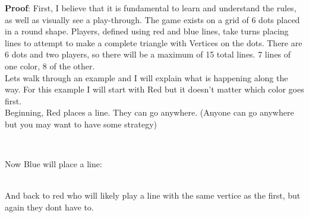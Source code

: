 \documentclass[10pt, AMS Euler]{article}
\begin{document}
\begin{enumerate}
\textbf{Proof}:
First, I believe that it is fundamental to learn and understand the rules, as well as visually see a play-through. The game exists on a grid of 6 dots placed in a round shape. Players, defined using red and blue lines, take turns placing lines to attempt to make a complete triangle with Vertices on the dots. There are 6 dots and two players, so there will be a maximum of 15 total lines. 7 lines of one color, 8 of the other. \\
Lets walk through an example and I will explain what is happening along the way.  For this example I will start with Red but it doesn't matter which color goes first. \\
Beginning, Red places a line. They can go anywhere. (Anyone can go anywhere but you may want to have some strategy)
        \begin{center}
            \\
        \end{center}
Now Blue will place a line:
        \begin{center}
            \\
And back to red who will likely play a line with the same vertice as the first, but again they dont have to.         \end{center}


\end{enumerate}
\end{document}
